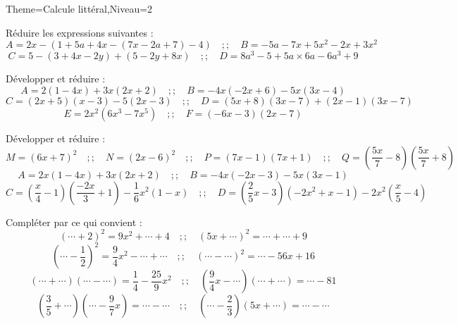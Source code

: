 \documentclass[a4paper,12pt]{article}
\begin{document}
\begin{Maquette}[Fiche]{Theme=Calcule littéral,Niveau=2}



\begin{exercice}
Réduire les expressions suivantes :
\[
A=2x-\left(1+5a+4x-\left(7x-2a+7\right)-4\right)\quad ;; \quad
B=-5a-7x+5x^{2}-2x+3x^{2}
\]
\[
C=5-\left(3+4x-2y\right)+\left(5-2y+8x\right)\quad ;; \quad
D=8a^{3}-5+5a\times 6a-6a^{3}+9
\]
\end{exercice}

\begin{exercice}
Développer et réduire :
\[
A=2\left(1-4x\right)+3x\left(2x+2\right)\quad ;; \quad
B=-4x\left(-2x+6\right)-5x\left(3x-4\right)
\]
\[
C=\left(2x+5\right)\left(x-3\right)-5\left(2x-3\right)\quad ;; \quad
D=\left(5x+8\right)\left(3x-7\right)+\left(2x-1\right)\left(3x-7\right)
\]
\[
E=2x^{2}\left(6x^{3}-7x^{5}\right)\quad ;; \quad
F=\left(-6x-3\right)\left(2x-7\right)
\]
\end{exercice}

\begin{exercice}
Développer et réduire :
\[
M=\left(6x+7\right)^{2}\quad ;; \quad
N=\left(2x-6\right)^{2}\quad ;; \quad
P=\left(7x-1\right)\left(7x+1\right)\quad ;; \quad
Q=\left(\dfrac{5x}{7}-8\right)\left(\dfrac{5x}{7}+8\right)
\]
\[
A=2x\left(1-4x\right)+3x\left(2x+2\right)\quad ;; \quad
B=-4x\left(-2x-3\right)-5x\left(3x-1\right)
\]
\[
C=\left(\dfrac{x}{4}-1\right)\left(\dfrac{-2x}{3}+1\right)-\dfrac{1}{6}x^{2}\left(1-x\right)\quad ;; \quad
D=\left(\dfrac{2}{5}x-3\right)\left(-2x^{2}+x-1\right)-2x^{2}\left(\dfrac{x}{5}-4\right)
\]
\end{exercice}

\begin{exercice}
Compléter par ce qui convient :
\[
\left(\cdots + 2\right)^{2}=9x^{2}+\cdots +4 \quad ;; \quad
\left(5x+\cdots\right)^{2}=\cdots + \cdots +9
\]
\[
\left(\cdots - \dfrac{1}{2}\right)^{2}=\dfrac{9}{4}x^{2}-\cdots +\cdots\quad ;; \quad
\left(\cdots - \cdots \right)^{2}=\cdots - 56x+16
\]
\[
\left(\cdots +\cdots\right)\left(\cdots - \cdots\right)=\dfrac{1}{4}-\dfrac{25}{9}x^{2}\quad ;; \quad
\left(\dfrac{9}{4}x-\cdots\right)\left(\cdots + \cdots\right)=\cdots - 81
\]
\[
\left(\dfrac{3}{5}+\cdots\right)\left(\cdots -\dfrac{9}{7}x\right)=\cdots - \cdots\quad ;; \quad
\left(\cdots - \dfrac{2}{3}\right)\left(5x+\cdots\right)=\cdots - \cdots
\]
\end{exercice}


\end{Maquette}
\end{document}
